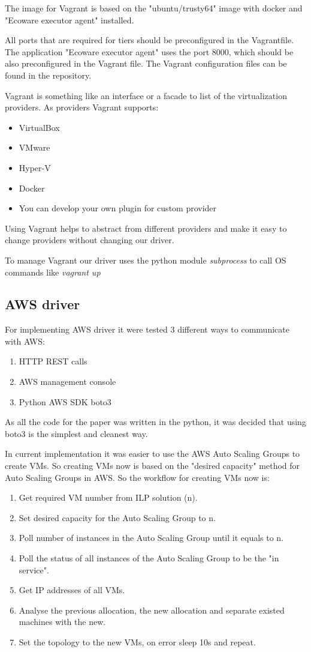The image for Vagrant is based on the "ubuntu/trusty64" image with docker and "Ecoware executor agent" installed.

All ports that are required for tiers should be preconfigured in the Vagrantfile. The application "Ecoware executor agent" uses the port 8000, which should be also preconfigured in the Vagrant file. The Vagrant configuration files can be found in the repository.

Vagrant is something like an interface or a facade to list of the virtualization providers. As providers Vagrant supports:
\begin{itemize}
    \item VirtualBox
    \item VMware
    \item Hyper-V
    \item Docker
    \item You can develop your own plugin for custom provider
\end{itemize}
Using Vagrant helps to abstract from different providers and make it easy to change providers without changing our driver.

To manage Vagrant our driver uses the python module \textit{subprocess} to call OS commands like \textit{vagrant up}

\subsection{AWS driver}
For implementing AWS driver it were tested 3 different ways to communicate with AWS:
\begin{enumerate}
    \item HTTP REST calls
    \item AWS management console
    \item Python AWS SDK boto3
\end{enumerate}
As all the code for the paper was written in the python, it was decided that using boto3 is the simplest and cleanest way.

In current implementation it was easier to use the AWS Auto Scaling Groups to create VMs. So creating VMs now is based on the "desired capacity" method for Auto Scaling Groups in AWS. So the workflow for creating VMs now is:
\begin{enumerate}
    \item Get required VM number from ILP solution (n).
    \item Set desired capacity for the Auto Scaling Group to n.
    \item Poll number of instances in the Auto Scaling Group until it equals to n.
    \item Poll the status of all instances of the Auto Scaling Group to be the "in service".
    \item Get IP addresses of all VMs.
    \item Analyse the previous allocation, the new allocation and separate existed machines with the new.
    \item Set the topology to the new VMs, on error sleep 10s and repeat.
\end{enumerate}

